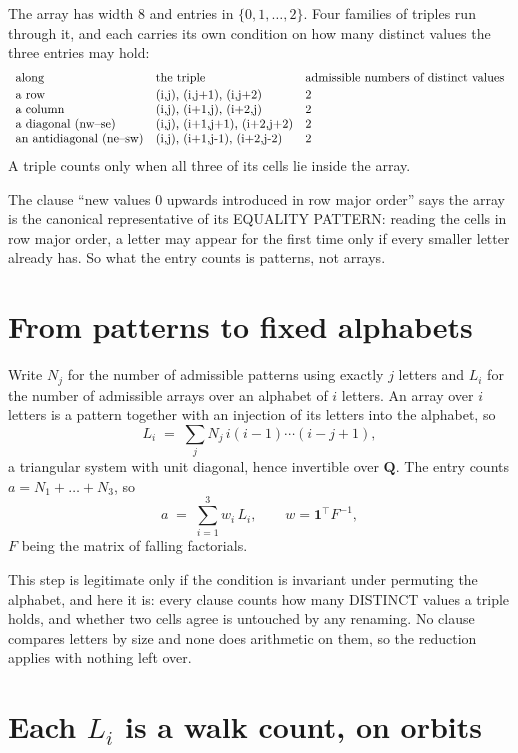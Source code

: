 \documentclass[11pt,a4paper]{article}
\theoremstyle{plain}
\theoremstyle{definition}
\begin{document}
The array has width $8$ and entries in $\{0,1,\dots,2\}$. Four families of triples
run through it, and each carries its own condition on how many distinct values the three
entries may hold:
\[
\begin{array}{lll}
\text{along} & \text{the triple} & \text{admissible numbers of distinct values} \\[2pt]
\text{a row} & $(i,j),\ (i,j+1),\ (i,j+2)$ & $2$ \\
\text{a column} & $(i,j),\ (i+1,j),\ (i+2,j)$ & $2$ \\
\text{a diagonal (nw--se)} & $(i,j),\ (i+1,j+1),\ (i+2,j+2)$ & $2$ \\
\text{an antidiagonal (ne--sw)} & $(i,j),\ (i+1,j-1),\ (i+2,j-2)$ & $2$ \\
\end{array}
\]
A triple counts only when all three of its cells lie inside the array.

The clause ``new values $0$ upwards introduced in row major order'' says the array is the
canonical representative of its EQUALITY PATTERN: reading the cells in row major order, a
letter may appear for the first time only if every smaller letter already has. So what the
entry counts is patterns, not arrays.

\section{From patterns to fixed alphabets}

Write $N_j$ for the number of admissible patterns using exactly $j$ letters and $L_i$ for the
number of admissible arrays over an alphabet of $i$ letters. An array over $i$ letters is a
pattern together with an injection of its letters into the alphabet, so
\[
L_i\;=\;\sum_j N_j\,i(i-1)\cdots(i-j+1),
\]
a triangular system with unit diagonal, hence invertible over $\mathbf{Q}$. The entry counts
$a=N_1+\dots+N_{3}$, so
\[
a\;=\;\sum_{i=1}^{3}w_i\,L_i ,\qquad w=\mathbf{1}^{\!\top}F^{-1},
\]
$F$ being the matrix of falling factorials.

This step is legitimate only if the condition is invariant under permuting the alphabet, and
here it is: every clause counts how many DISTINCT values a triple holds, and whether two cells
agree is untouched by any renaming. No clause compares letters by size and none does arithmetic
on them, so the reduction applies with nothing left over.

\section{Each $L_i$ is a walk count, on orbits}
\end{document}
